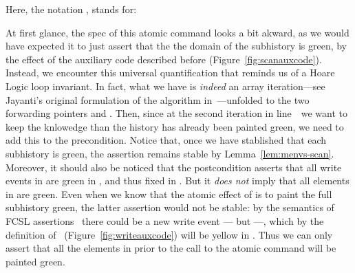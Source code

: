 Here, the notation  , stands for:

At first glance, the spec of this atomic command looks a bit akward,
as we would have expected it to just assert that the the domain of the
subhistory  is green, by the effect of the 
auxiliary code described before
(Figure~\ref{fig:scanauxcode}). Instead, we encounter this universal
quantification that reminds us of a Hoare Logic loop invariant. In
fact, what we have is \emph{indeed} an array iteration---see Jayanti's
original formulation of the algorithm
in~\cite{Jayanti+STOC05}---unfolded to the two forwarding pointers
 and . Then, since at the second iteration in
line~\lineScanClearsY\ we want to keep the knlowedge than the history
 has already been painted green, we need to add this to the
precondition. Notice that, once we have stablished that each
subhistory  is green, the assertion remains stable by
Lemma~\ref{lem:menvs-scan}. Moreover, it should also be noticed that
the postcondition asserts that all write events in  are green
in , and thus fixed in . But it \emph{does not}
imply that all elements in  are green. Even when we know that
the atomic effect of  is to paint the full subhistory
 green, the latter assertion would not be stable: by the
semantics of FCSL assertions~\cite{NanevskiLSD+ESOP14} there could be
a new write event --- but ---, which
by the definition of ~(Figure~\ref{fig:writeauxcode})
will be {\sf yellow} in . Thus we can only assert that all the
elements in  prior to the call to the atomic command will be
painted {\sf green}.



